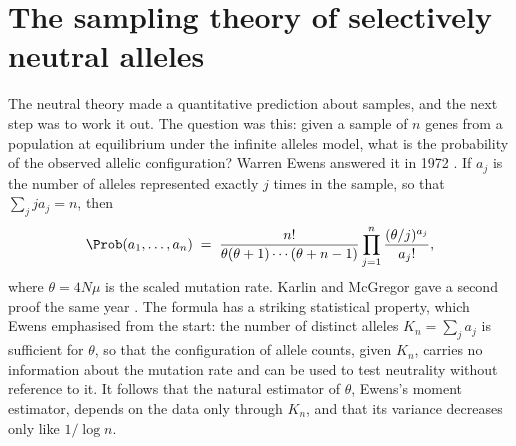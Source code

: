 \section{The sampling theory of selectively neutral alleles}

The neutral theory made a quantitative prediction about samples, and the next step was to work it
out. The question was this: given a sample of $n$ genes from a population at equilibrium under the
infinite alleles model, what is the probability of the observed allelic configuration? Warren Ewens
answered it in 1972 \citep{intro:ewens1972}. If $a_j$ is the number of alleles represented exactly
$j$ times in the sample, so that $\sum_j ja_j=n$, then
\begin{equation}\label{intro:eq:esf}
\Prob(a_1,\dots,a_n)\;=\;\frac{n!}{\theta(\theta+1)\cdots(\theta+n-1)}
\prod_{j=1}^{n}\frac{(\theta/j)^{a_j}}{a_j!},
\end{equation}
where $\theta=4N\mu$ is the scaled mutation rate. Karlin and McGregor gave a second proof the same
year \citep{intro:karlin1972}. The formula has a striking statistical property, which Ewens
emphasised from the start: the number of distinct alleles $K_n=\sum_ja_j$ is sufficient for
$\theta$, so that the configuration of allele counts, given $K_n$, carries no information about
the mutation rate and can be used to test neutrality without reference to it. It follows that
the natural estimator of $\theta$, Ewens's moment estimator, depends on the data only through
$K_n$, and that its variance decreases only like $1/\log n$.


